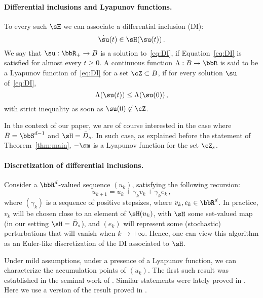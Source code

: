 \paragraph{Differential inclusions and Lyapunov functions.}
To every such $\sH$ we can associate a differential inclusion (DI):
\begin{equation}\label{eq:DI}
    \dot{\su}(t) \in \sH(\su(t)) \, .
\end{equation}
We say that $\su: \bbR_{+} \rightarrow B$ is a solution to~\eqref{eq:DI}, if Equation~\eqref{eq:DI} is satisfied for almost every $t \geq 0$.
A continuous function $\Lambda: B \rightarrow \bbR$ is said to be a Lyapunov function of~\eqref{eq:DI} for a set $\cZ \subset B$, if for every solution $\su$ of~\eqref{eq:DI},
\begin{equation*}
  \Lambda(\su(t)) \leq \Lambda(\su(0))\, ,
\end{equation*}
with strict inequality as soon as $\su(0) \not \in \cZ$. 

In the context of our paper, we are of course interested in the case where $B  = \bbS^{d-1}$ and $\sH = \bar{D}_s$. In such case, as explained before the statement of Theorem~\ref{thm:main}, $-\sm$ is a Lyapunov function for the set $\cZ_s$.


\paragraph{Discretization of differential inclusions.}
Consider a $\bbR^d$-valued sequence $(u_k)$, satisfying the following recursion:
\begin{equation*}
  u_{k+1} = u_k + \gamma_k v_k + \gamma_k e_k\, ,
\end{equation*}
where $(\gamma_k)$ is a sequence of positive stepsizes, where $v_k,e_k\in \bbR^d$. In practice, $v_k$ will be chosen close to an element of $\sH(u_k)$, with $\sH$ some set-valued map (in our setting $\sH = \bar{D}_s$), and $(e_k)$ will represent some (stochastic) perturbations that will vanish when $k \rightarrow + \infty$. Hence, one can view this algorithm as an Euler-like discretization of the DI associated to $\sH$. 

Under mild assumptions, under a presence of a Lyapunov function, we can characterize the accumulation points of $(u_k)$.
The first such result was established in the seminal work of \cite{benaim_05_DI_1}.
Similar statements were lately proved in \cite{duchi2018stochastic,borkar2008stochastic,dav-dru-kak-lee-19}. Here we use a version of the result proved in \cite[Theorem 3.2]{dav-dru-kak-lee-19}. 

